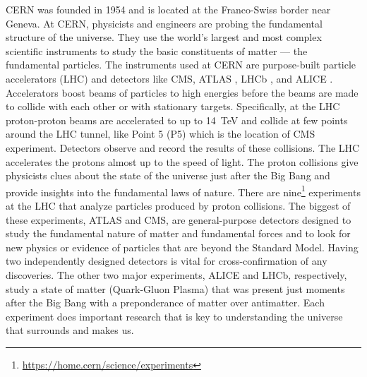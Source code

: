 CERN was founded in 1954 and is located at the Franco-Swiss border near Geneva. At CERN, physicists and engineers are probing the fundamental structure of the universe. They use the world's largest and most complex scientific instruments to study the basic constituents of matter --- the fundamental particles.
The instruments used at CERN are purpose-built particle accelerators (LHC) and detectors like CMS, ATLAS \cite{What_is_ATLAS}, LHCb \cite{What_is_LHCb}, and ALICE \cite{What_is_ALICE}. Accelerators boost beams of particles to high energies before the beams are made to collide with each other or with stationary targets. Specifically, at the LHC proton-proton beams are accelerated to up to 14~TeV and collide at few points around the LHC tunnel, like Point 5 (P5) which is the location of CMS experiment.
Detectors observe and record the results of these collisions.
The LHC accelerates the protons almost up to the speed of light.
The proton collisions give physicists clues about the state of the universe just after the Big Bang and provide insights into the fundamental laws of nature. There are nine\footnote{\url{https://home.cern/science/experiments}} experiments at the LHC that analyze particles produced by proton collisions.
The biggest of these experiments, ATLAS and CMS, are general-purpose detectors designed to study the
fundamental nature of matter and fundamental forces and to look for new physics or evidence of particles that are beyond the Standard Model. Having two independently designed detectors is vital for cross-confirmation of any discoveries. The other two major experiments, ALICE and LHCb, respectively, study a state of matter (Quark-Gluon Plasma) that was present just moments after the Big Bang with a preponderance of matter over antimatter. Each experiment does important research that is key to understanding the universe that surrounds and makes us.

